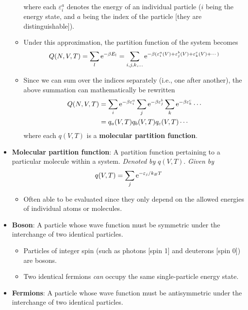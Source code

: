 \documentclass[../notes.tex]{subfiles}
\begin{document}
\begin{itemize}
\begin{itemize}
\begin{equation*}
        \end{equation*}
        where each $\varepsilon_i^a$ denotes the energy of an individual particle ($i$ being the energy state, and $a$ being the index of the particle [they are distinguishable]).
        \item Under this approximation, the partition function of the system becomes
        \begin{equation*}
            Q(N,V,T) = \sum_l\e[-\beta E_l] = \sum_{i,j,k,\dots}\e[-\beta(\varepsilon_i^a(V)+\varepsilon_j^b(V)+\varepsilon_k^c(V)+\cdots)]
        \end{equation*}
        \item Since we can sum over the indices separately (i.e., one after another), the above summation can mathematically be rewritten
        \begin{align*}
            Q(N,V,T) &= \sum_i\e[-\beta\varepsilon_i^a]\sum_j\e[-\beta\varepsilon_j^b]\sum_k\e[-\beta\varepsilon_k^c]\cdots\\
            &= q_a(V,T)q_b(V,T)q_c(V,T)\cdots
        \end{align*}
        where each $q(V,T)$ is a \textbf{molecular partition function}.
    \end{itemize}
    \item \textbf{Molecular partition function}: A partition function pertaining to a particular molecule within a system. \emph{Denoted by} $q(V,T)$. \emph{Given by}
    \begin{equation*}
        q(V,T) = \sum_j\e[-\varepsilon_j/k_BT]
    \end{equation*}
    \begin{itemize}
        \item Often able to be evaluated since they only depend on the allowed energies of individual atoms or molecules.
    \end{itemize}
    \item \textbf{Boson}: A particle whose wave function must be symmetric under the interchange of two identical particles.
    \begin{itemize}
        \item Particles of integer spin (such as photons [spin 1] and deuterons [spin 0]) are bosons.
        \item Two identical fermions \emph{can} occupy the same single-particle energy state.
    \end{itemize}
    \item \textbf{Fermions}: A particle whose wave function must be antisymmetric under the interchange of two identical particles.

\end{itemize}
\end{document}
